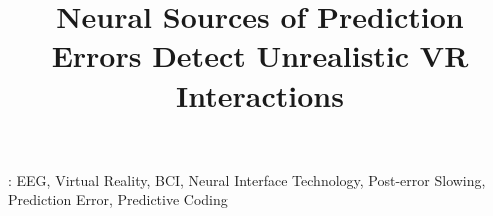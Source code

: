\documentclass[12pt]{iopart}
\begin{document}
\title[Neural Sources Detecting Unrealistic VR Interactions]{Neural Sources of Prediction Errors Detect Unrealistic VR Interactions}









%
\vspace{2pc}
: EEG, Virtual Reality, BCI, Neural Interface Technology, Post-error Slowing, Prediction Error, Predictive Coding
%
\submitto{\JNE}
%
% 
%
\end{document}
